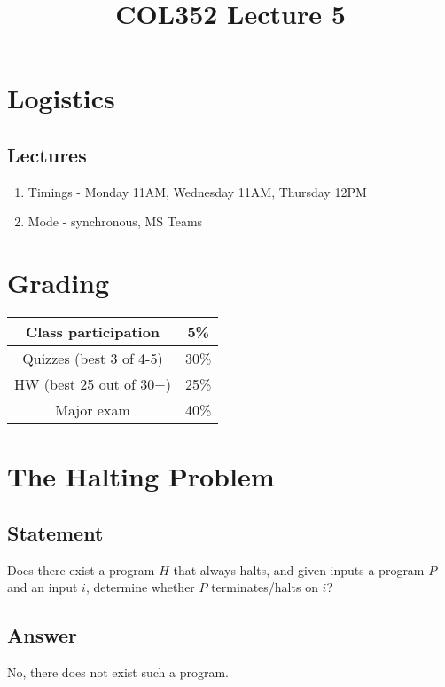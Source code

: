 \documentclass[a4paper]{article}
\title{\textbf{COL352 Lecture 5}}
\date{}
\begin{document}
\maketitle
\tableofcontents

\iffalse

\section{Logistics}
\subsection{Lectures}
\begin{enumerate}
    \item Timings - Monday 11AM, Wednesday 11AM, Thursday 12PM
    \item Mode - synchronous, MS Teams
\end{enumerate}
\section{Grading}
\begin{center}
\begin{tabular}{|c|c|}
    \hline
    Class participation     &  5\% \\
    \hline
    Quizzes (best 3 of 4-5) & 30\% \\
    \hline
    HW (best 25 out of 30+) & 25\% \\
    \hline
    Major exam	            & 40\% \\
    \hline
\end{tabular}
\end{center}
\section{The Halting Problem}
\subsection{Statement}
Does there exist a program $H$ that always halts, and given inputs a program $P$ and an input $i$, determine whether $P$ terminates/halts on $i$?
\subsection{Answer}
No, there does not exist such a program.
\end{document}
